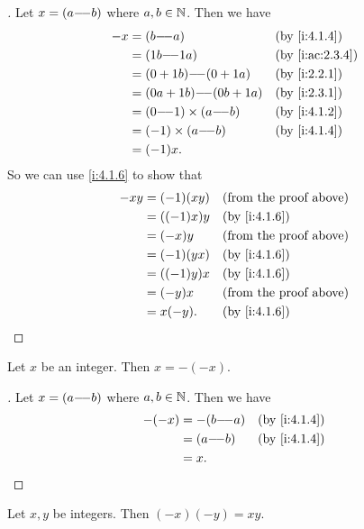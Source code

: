 \begin{proof}[]
  Let \(x = (a {-}\!{-} b)\) where \(a, b \in \mathbb{N}\).
  Then we have
  \begin{align*}
    -x & = (b \mm a)                  &  & \by{i:4.1.4}    \\
       & = (1b \mm 1a)                &  & \by{i:ac:2.3.4} \\
       & = (0 + 1b) \mm (0 + 1a)      &  & \by{i:2.2.1}    \\
       & = (0a + 1b) \mm (0b + 1a)    &  & \by{i:2.3.1}    \\
       & = (0 \mm 1) \times (a \mm b) &  & \by{i:4.1.2}    \\
       & = (-1) \times (a \mm b)      &  & \by{i:4.1.4}    \\
       & = (-1) x.
  \end{align*}
  So we can use \cref{i:4.1.6} to show that
  \begin{align*}
    -xy & = (-1) (xy)  &  & \text{(from the proof above)} \\
        & = ((-1) x) y &  & \by{i:4.1.6}                  \\
        & = (-x) y     &  & \text{(from the proof above)} \\
        & = (-1) (yx)  &  & \by{i:4.1.6}                  \\
        & = ((-1) y) x &  & \by{i:4.1.6}                  \\
        & = (-y) x     &  & \text{(from the proof above)} \\
        & = x (-y).    &  & \by{i:4.1.6}
  \end{align*}
\end{proof}

\begin{ac}\label{i:ac:4.1.6}
  Let \(x\) be an integer.
  Then \(x = -(-x)\).
\end{ac}

\begin{proof}[]
  Let \(x = (a {-}\!{-} b)\) where \(a, b \in \mathbb{N}\).
  Then we have
  \begin{align*}
    -(-x) & = -(b \mm a) &  & \by{i:4.1.4} \\
          & = (a \mm b)  &  & \by{i:4.1.4} \\
          & = x.
  \end{align*}
\end{proof}

\begin{ac}\label{i:ac:4.1.7}
  Let \(x, y\) be integers.
  Then \((-x)(-y) = xy\).
\end{ac}

